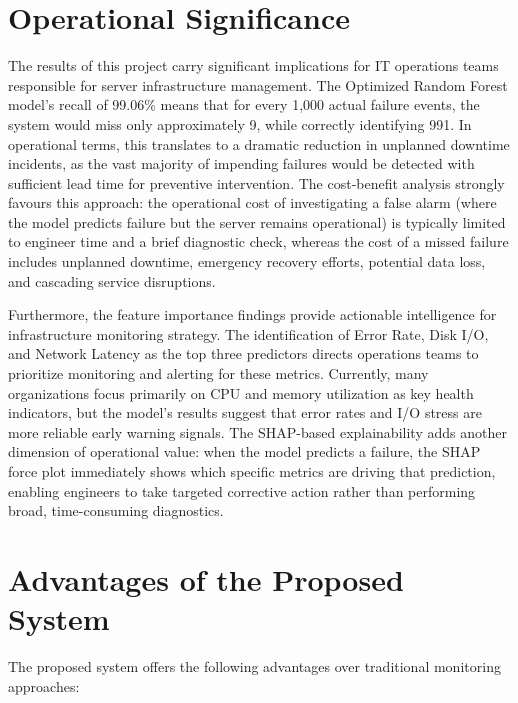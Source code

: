 \documentclass[12pt,letterpaper]{report}
\begin{document}
\section{Operational Significance}

The results of this project carry significant implications for IT operations teams responsible for server infrastructure management. The Optimized Random Forest model's recall of 99.06\% means that for every 1,000 actual failure events, the system would miss only approximately 9, while correctly identifying 991. In operational terms, this translates to a dramatic reduction in unplanned downtime incidents, as the vast majority of impending failures would be detected with sufficient lead time for preventive intervention. The cost-benefit analysis strongly favours this approach: the operational cost of investigating a false alarm (where the model predicts failure but the server remains operational) is typically limited to engineer time and a brief diagnostic check, whereas the cost of a missed failure includes unplanned downtime, emergency recovery efforts, potential data loss, and cascading service disruptions.

Furthermore, the feature importance findings provide actionable intelligence for infrastructure monitoring strategy. The identification of Error Rate, Disk I/O, and Network Latency as the top three predictors directs operations teams to prioritize monitoring and alerting for these metrics. Currently, many organizations focus primarily on CPU and memory utilization as key health indicators, but the model's results suggest that error rates and I/O stress are more reliable early warning signals. The SHAP-based explainability adds another dimension of operational value: when the model predicts a failure, the SHAP force plot immediately shows which specific metrics are driving that prediction, enabling engineers to take targeted corrective action rather than performing broad, time-consuming diagnostics.

\section{Advantages of the Proposed System}

The proposed system offers the following advantages over traditional monitoring approaches:
\end{document}
